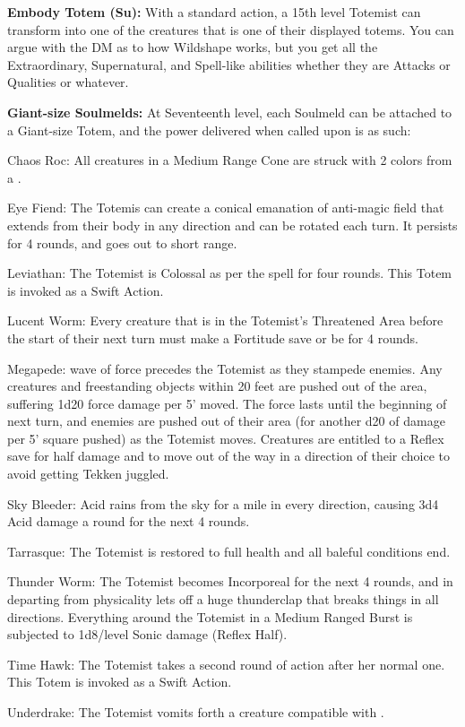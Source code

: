 \textbf{Embody Totem (Su):} With a standard action, a 15th level Totemist can transform into one of the creatures that is one of their displayed totems. You can argue with the DM as to how Wildshape works, but you get all the Extraordinary, Supernatural, and Spell-like abilities whether they are Attacks or Qualities or whatever.

\textbf{Giant-size Soulmelds:} At Seventeenth level, each Soulmeld can be attached to a Giant-size Totem, and the power delivered when called upon is as such:
\begin{description*}
\item[Chaos Roc:] All creatures in a Medium Range Cone are struck with 2 colors from a .
\item[Eye Fiend:] The Totemis can create a conical emanation of anti-magic field that extends from their body in any direction and can be rotated each turn. It persists for 4 rounds, and goes out to short range.
\item[Leviathan:] The Totemist is Colossal as per the spell  for four rounds. This Totem is invoked as a Swift Action.
\item[Lucent Worm:] Every creature that is in the Totemist's Threatened Area before the start of their next turn must make a Fortitude save or be  for 4 rounds.
\item[Megapede:] wave of force precedes the Totemist as they stampede enemies. Any creatures and freestanding objects within 20 feet are pushed out of the area, suffering 1d20 force damage per 5' moved. The force lasts until the beginning of next turn, and enemies are pushed out of their area (for another d20 of damage per 5' square pushed) as the Totemist moves. Creatures are entitled to a Reflex save for half damage and to move out of the way in a direction of their choice to avoid getting Tekken juggled.
\item[Sky Bleeder:] Acid rains from the sky for a mile in every direction, causing 3d4 Acid damage a round for the next 4 rounds.
\item[Tarrasque:] The Totemist is restored to full health and all baleful conditions end.
\item[Thunder Worm:] The Totemist becomes Incorporeal for the next 4 rounds, and in departing from physicality lets off a huge thunderclap that breaks things in all directions. Everything around the Totemist in a Medium Ranged Burst is subjected to 1d8/level Sonic damage (Reflex Half).
\item[Time Hawk:] The Totemist takes a second round of action after her normal one. This Totem is invoked as a Swift Action.
\item[Underdrake:] The Totemist vomits forth a creature compatible with .
\end{description*}


